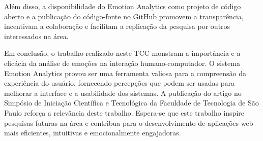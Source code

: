Além disso, a disponibilidade do Emotion Analytics como projeto de código aberto e a publicação do código-fonte no GitHub \cite{22}\cite{23} promovem a transparência, incentivam a colaboração e facilitam a replicação da pesquisa por outros interessados na área.

Em conclusão, o trabalho realizado neste TCC monstram a importância e a eficácia da análise de emoções na interação humano-computador. O sistema Emotion Analytics provou ser uma ferramenta valiosa para a compreensão da experiência do usuário, fornecendo percepções que podem ser usadas para melhorar a interface e a usabilidade dos sistemas. A publicação do artigo no Simpósio de Iniciação Científica e Tecnológica da Faculdade de Tecnologia de São Paulo reforça a relevância deste trabalho. Espera-se que este trabalho inspire pesquisas futuras na área e contribua para o desenvolvimento de aplicações web mais eficientes, intuitivas e emocionalmente engajadoras.
